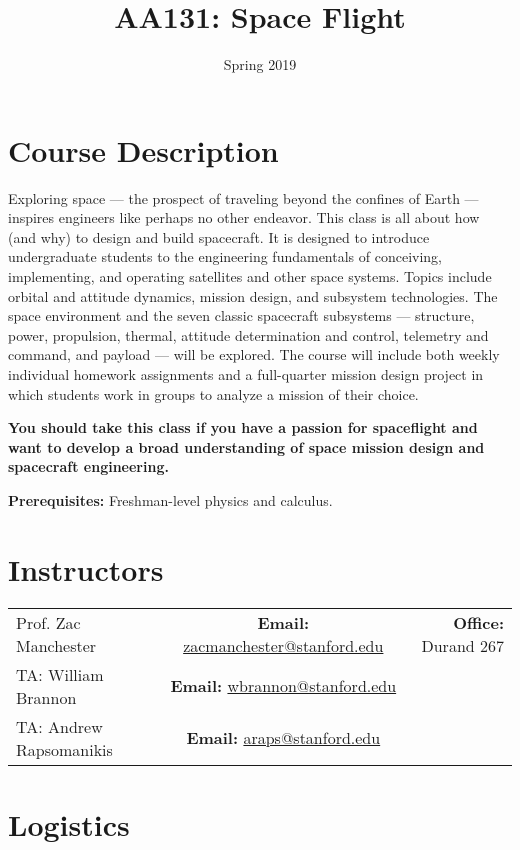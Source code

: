\documentclass[11pt,letterpaper]{article}
\title{AA131: Space Flight}
\author{Spring 2019}
\date{}
\begin{document}
\maketitle

\section*{Course Description}

Exploring space --- the prospect of traveling beyond the confines of Earth --- inspires engineers like perhaps no other endeavor. This class is all about how (and why) to design and build spacecraft. It is designed to introduce undergraduate students to the engineering fundamentals of conceiving, implementing, and operating satellites and other space systems. Topics include orbital and attitude dynamics, mission design, and subsystem technologies. The space environment and the seven classic spacecraft subsystems --- structure, power, propulsion, thermal, attitude determination and control, telemetry and command, and payload --- will be explored. The course will include both weekly individual homework assignments and a full-quarter mission design project in which students work in groups to analyze a mission of their choice.

\medskip
\noindent
\textbf{You should take this class if you have a passion for spaceflight and want to develop a broad understanding of space mission design and spacecraft engineering.}

\medskip
\noindent
\textbf{Prerequisites:} Freshman-level physics and calculus.

\section*{Instructors}

\begin{center}
\begin{tabular}{l c r}
	Prof. Zac Manchester & \textbf{Email:} \href{mailto:zacmanchester@stanford.edu}{zacmanchester@stanford.edu} & \textbf{Office:} Durand 267 \\
	TA: William Brannon & \textbf{Email:} \href{mailto:wbrannon@stanford.edu}{wbrannon@stanford.edu}
	\\
	TA: Andrew Rapsomanikis & \textbf{Email:} \href{mailto:araps@stanford.edu}{araps@stanford.edu}
\end{tabular}
\end{center}

\section*{Logistics}
\end{document}
